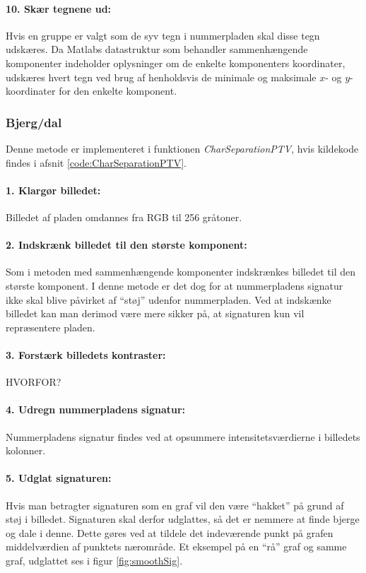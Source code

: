 \paragraph{10. Skær tegnene ud:} Hvis en gruppe er valgt som de syv tegn i nummerpladen skal disse tegn udskæres. Da Matlabs datastruktur som behandler sammenhængende komponenter indeholder oplysninger om de enkelte komponenters koordinater, udskæres hvert tegn ved brug af henholdsvis de minimale og maksimale $x$- og $y$-koordinater for den enkelte komponent.

\subsubsection*{Bjerg/dal}
Denne metode er implementeret i funktionen \textit{CharSeparationPTV}, hvis kildekode findes i afsnit \vref{code:CharSeparationPTV}.

\paragraph{1. Klargør billedet:} Billedet af pladen omdannes fra RGB til 256 gråtoner.

\paragraph{2. Indskrænk billedet til den største komponent:} Som i metoden med sammenhængende komponenter indskrænkes billedet til den største komponent. I denne metode er det dog for at nummerpladens signatur ikke skal blive påvirket af ``støj'' udenfor nummerpladen. Ved at indskænke billedet kan man derimod være mere sikker på, at signaturen kun vil repræsentere pladen.

\paragraph{3. Forstærk billedets kontraster:}
HVORFOR?

\paragraph{4. Udregn nummerpladens signatur:} Nummerpladens signatur findes ved at opsummere intensitetsværdierne i billedets kolonner.

\paragraph{5. Udglat signaturen:} Hvis man betragter signaturen som en graf vil den være ``hakket'' på grund af støj i billedet. Signaturen skal derfor udglattes, så det er nemmere at finde bjerge og dale i denne. Dette gøres ved at tildele det indeværende punkt på grafen middelværdien af punktets nærområde. Et eksempel på en ``rå'' graf og samme graf, udglattet ses i figur \vref{fig:smoothSig}.

